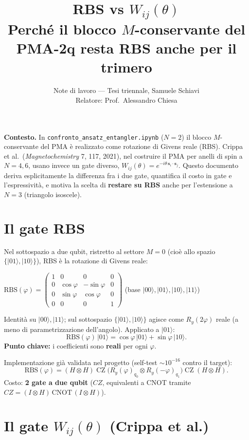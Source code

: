 \documentclass[11pt,a4paper]{article}
\title{\vspace{-1.5em}\color{inkblue}RBS vs $W_{ij}(\theta)$\\[0.1em]
\Large\normalfont\color{softgray}Perché il blocco $M$-conservante del PMA-2q resta RBS anche per il trimero}
\author{Note di lavoro --- Tesi triennale, Samuele Schiavi\\ Relatore: Prof.\ Alessandro Chiesa}
\date{}
\begin{document}
\sloppy
\maketitle
\thispagestyle{fancy}
\vspace{-2em}

\textbf{Contesto.} In \texttt{confronto\_ansatz\_entangler.ipynb} ($N=2$) il
blocco $M$-conservante del PMA è realizzato come rotazione di Givens
reale (RBS). Crippa et al.\ (\emph{Magnetochemistry} 7, 117, 2021), nel
costruire il PMA per anelli di spin a $N=4,6$, usano invece un gate
diverso, $W_{ij}(\theta)=e^{-i\theta\,\mathbf s_i\cdot\mathbf s_j}$.
Questo documento deriva esplicitamente la differenza fra i due gate,
quantifica il costo in gate e l'espressività, e motiva la scelta di
\textbf{restare su RBS} anche per l'estensione a $N=3$ (triangolo
isoscele).

\section{Il gate RBS}

Nel sottospazio a due qubit, ristretto al settore $M=0$ (cioè allo
spazio $\{|01\rangle,|10\rangle\}$), RBS è la rotazione di Givens reale:
\begin{keyeq}
\centering
$\mathrm{RBS}(\varphi)=\begin{pmatrix}1&0&0&0\\0&\cos\varphi&-\sin\varphi&0\\0&\sin\varphi&\cos\varphi&0\\0&0&0&1\end{pmatrix}$
\quad (base $|00\rangle,|01\rangle,|10\rangle,|11\rangle$)
\end{keyeq}
Identità su $|00\rangle,|11\rangle$; sul sottospazio
$\{|01\rangle,|10\rangle\}$ agisce come $R_y(2\varphi)$ reale (a meno di
parametrizzazione dell'angolo). Applicato a $|01\rangle$:
$$\mathrm{RBS}(\varphi)\,|01\rangle=\cos\varphi\,|01\rangle+\sin\varphi\,|10\rangle.$$
\textbf{Punto chiave:} i coefficienti sono \textbf{reali} per ogni
$\varphi$.

Implementazione già validata nel progetto (self-test $\sim10^{-16}$
contro il target):
$$\mathrm{RBS}(\varphi)=(H\otimes H)\;\mathrm{CZ}\;\big(R_y(\varphi)_{q_0}\otimes R_y(-\varphi)_{q_1}\big)\;\mathrm{CZ}\;(H\otimes H).$$
Costo: \textbf{2 gate a due qubit} ($CZ$, equivalenti a CNOT tramite
$CZ=(I\otimes H)\,\mathrm{CNOT}\,(I\otimes H)$).

\section{Il gate $W_{ij}(\theta)$ (Crippa et al.)}
\end{document}
